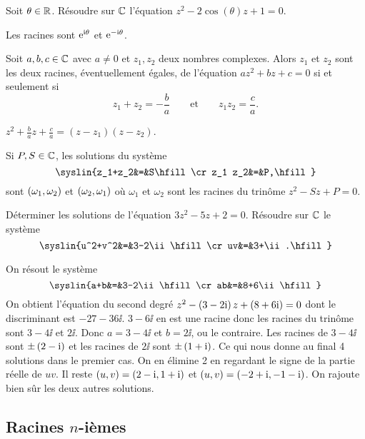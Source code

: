 \documentclass{magnoliaold}
\begin{document}
\begin{exoUnique}
\exo Soit $\theta\in\mathbb{R}$. Résoudre sur $\mathbb{C}$ l'équation
  $z^2-2\cos(\theta)z+1=0$.
  \begin{sol}
  Les racines sont ${\rm e}^{{\rm i}\theta}$ et ${\rm e}^{-{\rm i}\theta}$.
  \end{sol}
\end{exoUnique}

\begin{proposition}
Soit $a,b,c\in\mathbb{C}$ avec $a\not=0$ et $z_1,z_2$ deux nombres complexes. Alors $z_1$
et $z_2$ sont les deux racines, éventuellement égales, de l'équation
$az^2+bz+c=0$ si et seulement si
\[z_1+z_2=-\frac{b}{a} \qquad \text{et} \qquad z_1 z_2=\frac{c}{a}.\]
\end{proposition}

\begin{preuve}
$\displaystyle z^2+\frac{b}{a}z+\frac{c}{a}=(z-z_1)(z-z_2)$.
\end{preuve}
\begin{remarqueUnique}
\remarque Si $P,S\in\mathbb{C}$, les solutions du système
  \[\syslin{z_1+z_2&=&S\hfill\cr
             z_1 z_2&=&P,\hfill}\]
  sont $\left(\omega_1,\omega_2\right)$ et $\left(\omega_2,\omega_1\right)$ où $\omega_1$
  et $\omega_2$ sont les racines du trinôme $z^2-Sz+P=0$.
\end{remarqueUnique}
\begin{exos}
\exo Déterminer les solutions de l'équation $3z^2-5z+2=0$.
\exo Résoudre sur $\mathbb{C}$ le système
  \[\syslin{u^2+v^2&=&3-2\ii\hfill\cr
                 uv&=&3+\ii.\hfill}\]
  \begin{sol}
  On résout le système                 
  \[\syslin{a+b&=&3-2\ii\hfill\cr
             ab&=&8+6\ii\hfill}\]
  On obtient l'équation du second degré $z^2-\left(3-2{\rm i}\right)z+\left(8+6{\rm i}\right)=0$ dont le
  discriminant est $-27-36\ii$. $3-6\ii$ en est une racine donc les racines
  du trinôme sont $3-4\ii$ et $2\ii$. Donc $a=3-4\ii$ et $b=2\ii$, ou le contraire.
  Les racines de $3-4\ii$ sont $\pm\left(2-{\rm i}\right)$ et les racines de $2\ii$ sont
  $\pm\left(1+{\rm i}\right)$. Ce qui nous donne au final 4 solutions dans le premier cas.
  On en élimine 2 en regardant le signe de la partie réelle de $uv$. Il
  reste $\left(u,v\right)=\left(2-{\rm i},1+{\rm i}\right)$ et $\left(u,v\right)=\left(-2+{\rm i},-1-{\rm i}\right)$. On rajoute bien sûr
  les deux autres solutions.
  \end{sol}
\end{exos}

\subsection{Racines $n$-ièmes}
\end{document}
